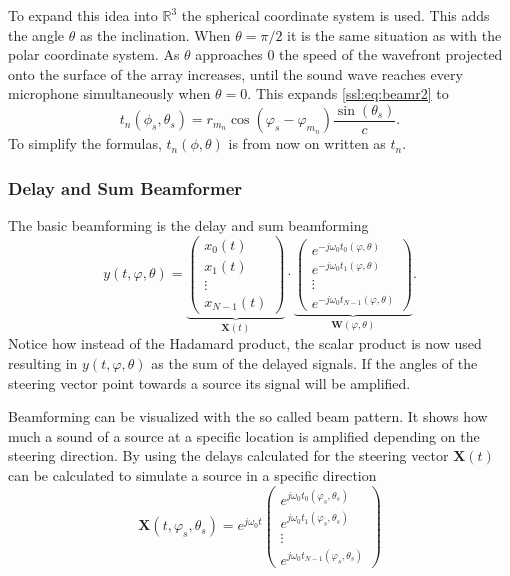 To expand this idea into $\mathbb{R}^3$ the spherical coordinate system is used.
This adds the angle $\theta$ as the inclination.
When $\theta = \pi/2$ it is the same situation as with the polar coordinate system.
As $\theta$ approaches 0 the speed of the wavefront projected onto the
surface of the array increases, until the sound wave reaches every microphone
simultaneously when $\theta = 0$.
This expands \eqref{ssl:eq:beamr2} to
\begin{equation}
	t_n(\phi_s, \theta_s) = 
	r_{m_n} \cos(\varphi_s - \varphi_{m_n})
	\frac{\sin(\theta_s)}{c}.
  \label{ssl:eq:beamr3}
\end{equation}
To simplify the formulas, $t_n(\phi, \theta)$ is from now on written as $t_n$.

\subsubsection{Delay and Sum Beamformer}
The basic beamforming is the delay and sum beamforming
\begin{equation}
	\label{ssl:eq:delAndSum}
	y(t, \varphi, \theta) = 
	  \underbrace{
		\begin{pmatrix} 
		  x_0(t) \\ 
		  x_1(t) \\
		  \vdots \\ 
		  x_{N-1}(t)
	  \end{pmatrix}}_{\bm{X}(t)}
	  \cdot
	  \underbrace{
		\begin{pmatrix} 
			e^{-j\omega_0 t_0(\varphi, \theta)} \\ 
			e^{-j\omega_0 t_1(\varphi, \theta)} \\
			\vdots \\ 
			e^{-j\omega_0 t_{N-1}(\varphi, \theta)} 
		\end{pmatrix}}_{\bm{W}(\varphi, \theta)}.
\end{equation}
Notice how instead of the Hadamard product, the scalar product is now used resulting
in $y(t, \varphi, \theta)$ as the sum of the delayed signals.
If the angles of the steering vector point towards a source its 
signal will be amplified.

Beamforming can be visualized with the so called beam pattern.
It shows how much a sound of a source at a specific location
is amplified depending on the steering direction.
By using the delays calculated for the steering vector $\bm{X}(t)$ can
be calculated to simulate a source in a specific direction
\begin{equation}
	\bm{X}(t, \varphi_s, \theta_s) = 
	e^{j\omega_0 t}
	\begin{pmatrix} 
		e^{j\omega_0 t_0(\varphi_s, \theta_s)} \\ 
		e^{j\omega_0 t_1(\varphi_s, \theta_s)} \\
		\vdots \\ 
		e^{j\omega_0 t_{N-1}(\varphi_s, \theta_s)} 
	\end{pmatrix}
\end{equation}

